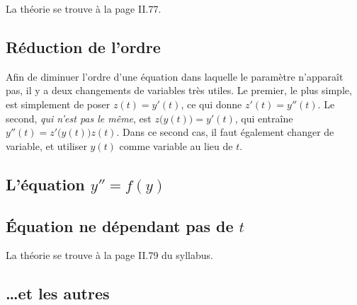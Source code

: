 La théorie se trouve à la page II.77.


					\subsection{Réduction de l'ordre}

Afin de diminuer l'ordre d'une équation dans laquelle le paramètre n'apparaît pas, il y a deux changements de variables très utiles. Le premier, le plus simple, est simplement de poser $z(t)=y'(t)$, ce qui donne $z'(t)=y''(t)$. Le second, \emph{qui n'est pas le même}, est $z\big( y(t) \big)=y'(t)$, qui entraîne $y''(t)=z'\big( y(t) \big)z(t)$. Dans ce second cas, il faut également changer de variable, et utiliser $y(t)$ comme variable au lieu de $t$.

					\subsection{L'équation \texorpdfstring{$y''=f(y)$}{yfy}}

					\subsection{Équation ne dépendant pas de \texorpdfstring{$t$}{t}}

La théorie se trouve à la page II.79 du syllabus.

					\subsection{\ldots et les autres}





